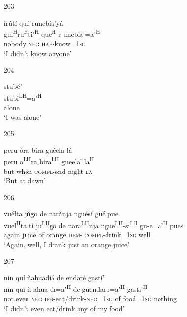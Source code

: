 \begin{itemize}
\item[203]
 
\glll   \'{i}r\'{u}t\'{i} qu\'{e} runebia'y\'{a} \\
gui\textsuperscript{H}ru\textsuperscript{H}ti'\textsuperscript{H} que\textsuperscript{H} r-unebia'=a'\textsuperscript{H} \\
nobody \textsc{neg} \textsc{hab}-know=\textsc{1sg}\\
\glt `I didn't know anyone'
 


\item[204]
 
\glll  stub\'{e}'\\
stubi\textsuperscript{LH}=a'\textsuperscript{H}\\
alone\\
\glt `I was alone'
 



\item[205]
 
\glll   peru \v{o}ra bira gu\'{e}ela l\'{a} \\
 peru  o\textsuperscript{LH}ra bira\textsuperscript{LH} gueela' la\textsuperscript{H} \\
 but when \textsc{compl}-end night \textsc{la}\\
\glt `But at dawn'
 


\item[206]
 
\glll   vu\'{e}lta j\v{u}go de nar\v{a}nja ngu\'{e}s\'{i} g\"{u}\'{e} pue\\
vuel\textsuperscript{H}ta ti ju\textsuperscript{LH}go de nara\textsuperscript{LH}nja ngue\textsuperscript{LH}-si\textsuperscript{LH} gu-e=a'\textsuperscript{H} pues\\
 again juice of orange \textsc{dem}- \textsc{compl}-drink=\textsc{1sg} well\\
\glt `Again, well, I drank just an orange juice'
 


\item[207]

\glll nin qu\'{i} \~{n}ahuadi\'{a} de endar\'{e} gast\'{i}'\\
nin qui \~{n}-ahua-di=a'\textsuperscript{H} de guendaro=a'\textsuperscript{H} gasti'\textsuperscript{H}\\
not.even \textsc{neg} \textsc{irr}-eat/drink-\textsc{neg}=\textsc{1sg} of food=\textsc{1sg} nothing\\
\glt `I didn't even eat/drink any of my food'



\end{itemize}
